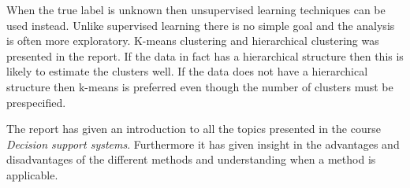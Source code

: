 When the true label is unknown then unsupervised learning techniques can be used instead. Unlike supervised learning there is no simple goal and the analysis is often more exploratory. K-means clustering and hierarchical clustering was presented in the report. If the data in fact has a hierarchical structure then this is likely to estimate the clusters well. If the data does not have a hierarchical structure then k-means is preferred even though the number of clusters must be prespecified. 

The report has given an introduction to all the topics presented in the course \emph{Decision support systems}. Furthermore it has given insight in the advantages and disadvantages of the different methods and understanding when a method is applicable.




